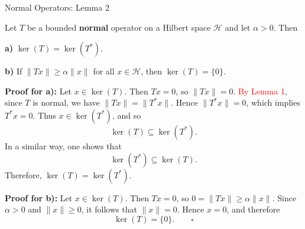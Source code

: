 \documentclass[9pt, aspectratio=169]{beamer}
\begin{document}
\begin{frame}{Normal Operators: Lemma 2}
    \begin{tcolorbox}[colback=blue!5, colframe=blue!20!orange, title=Lemma 2]
Let $T$ be a bounded \textbf{normal} operator on a Hilbert space $\mathcal{H}$ and let $\alpha>0$. Then

\textbf{a)} $\ker(T)=\ker(T^*)$.

\textbf{b)} If $\|Tx\|\ge \alpha \|x\|$ for all $x \in \mathcal{H}$, then $\ker(T)= \{0\}$.
\end{tcolorbox}
\pause
\textbf{Proof for a):} Let $x\in \ker(T)$. Then $Tx=0$, so $\|Tx\|=0$. \textcolor{red}{ By Lemma 1}, since $T$ is normal, we have
$
\|Tx\|=\|T^*x\|.
$
Hence $\|T^*x\|=0$, which implies $T^*x=0$. Thus $x\in \ker(T^*)$, and so
\[
\ker(T)\subseteq \ker(T^*).
\]
In a similar way, one shows that
\[
\ker(T^*)\subseteq \ker(T).
\]
Therefore,
$
\ker(T)=\ker(T^*).
$ \square

\pause
\textbf{Proof for b):} Let $x\in \ker(T)$. Then $Tx=0$, so
$
0=\|Tx\|\ge \alpha \|x\|.
$
Since $\alpha>0$ and $\|x\|\ge 0$, it follows that $\|x\|=0$. Hence $x=0$, and therefore
\[
\ker(T)=\{0\}.
\qquad\square\]   
\end{frame}
\end{document}
